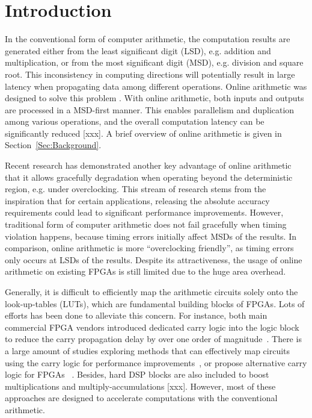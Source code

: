\documentclass[conference]{IEEEtran}
\begin{document}
\section{Introduction}\label{Sec:Intro}
In the conventional form of computer arithmetic, the computation results are generated either from the least significant digit (LSD), e.g. addition and multiplication, or from the most significant digit (MSD), e.g. division and square root. This inconsistency in computing directions will potentially result in large latency when propagating data among different operations. Online arithmetic was designed to solve this problem \cite{Ercegovac_OnlineOverview,Ercegovac_Book}. With online arithmetic, both inputs and outputs are processed in a MSD-first manner. This enables parallelism and duplication among various operations, and the overall computation latency can be significantly reduced [xxx]. A brief overview of online arithmetic is given in Section~\ref{Sec:Background}.

Recent research has demonstrated another key advantage of online arithmetic that it allows gracefully degradation when operating beyond the deterministic region, e.g. under overclocking. This stream of research stems from the inspiration that for certain applications, releasing the absolute accuracy requirements could lead to significant performance improvements. However, traditional form of computer arithmetic does not fail gracefully when timing violation happens, because timing errors initially affect MSDs of the results. In comparison, online arithmetic is more ``overclocking friendly'', as timing errors only occurs at LSDs of the results. Despite its attractiveness, the usage of online arithmetic on existing FPGAs is still limited due to the huge area overhead.

Generally, it is difficult to efficiently map the arithmetic circuits solely onto the look-up-tables (LUTs), which are fundamental building blocks of FPGAs. Lots of efforts has been done to alleviate this concern. For instance, both main commercial FPGA vendors introduced dedicated carry logic into the logic block to reduce the carry propagation delay by over one order of magnitude~\cite{Virtex6}. There is a large amount of studies exploring methods that can effectively map circuits using the carry logic for performance improvements~\cite{FPL10_FPGA_CarryChain,Prefix_CarryChain}, or propose alternative carry logic for FPGAs~\cite{FPGA_CarryChain_New1,FPGA_CarryChain_New2} . Besides, hard DSP blocks are also included to boost multiplications and multiply-accumulations [xxx]. However, most of these approaches are designed to accelerate computations with the conventional arithmetic. 
\end{document}
